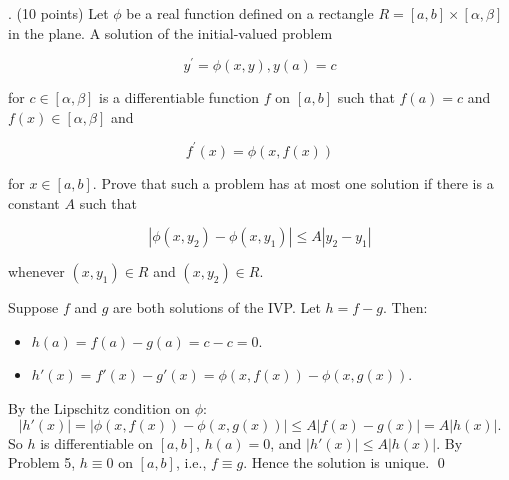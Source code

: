 \documentclass[10pt]{article}
\newenvironment{solution}{%
  \par\medskip\noindent{\color{red}\textbf{Solution.}}\color{red}\;}%
  {\par\medskip}
\begin{document}
. (10 points) Let $\phi$ be a real function defined on a rectangle $R=[a, b] \times[\alpha, \beta]$ in the plane. A solution of the initial-valued problem

$$
y^{\prime}=\phi(x, y), y(a)=c
$$

for $c \in[\alpha, \beta]$ is a differentiable function $f$ on $[a, b]$ such that $f(a)=c$ and $f(x) \in[\alpha, \beta]$ and

$$
f^{\prime}(x)=\phi(x, f(x))
$$

for $x \in[a, b]$. Prove that such a problem has at most one solution if there is a constant $A$ such that

$$
\left|\phi\left(x, y_{2}\right)-\phi\left(x, y_{1}\right)\right| \leq A\left|y_{2}-y_{1}\right|
$$

whenever $\left(x, y_{1}\right) \in R$ and $\left(x, y_{2}\right) \in R$.

\begin{solution}
Suppose $f$ and $g$ are both solutions of the IVP. Let $h = f - g$. Then:
\begin{itemize}
  \item $h(a) = f(a) - g(a) = c - c = 0$.
  \item $h'(x) = f'(x) - g'(x) = \phi(x, f(x)) - \phi(x, g(x))$.
\end{itemize}
By the Lipschitz condition on $\phi$:
$$
|h'(x)| = |\phi(x, f(x)) - \phi(x, g(x))| \leq A|f(x) - g(x)| = A|h(x)|.
$$
So $h$ is differentiable on $[a,b]$, $h(a) = 0$, and $|h'(x)| \leq A|h(x)|$. By Problem 5, $h \equiv 0$ on $[a,b]$, i.e., $f \equiv g$. Hence the solution is unique. \qed
\end{solution}
\end{document}
